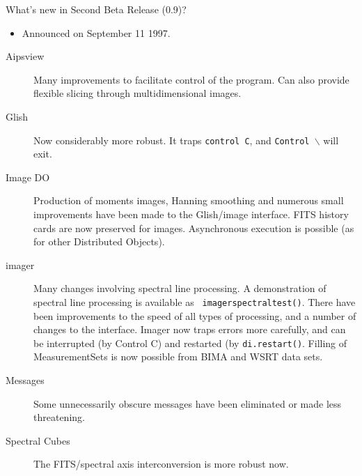 \begin{slide}{What's new in Second Beta Release (0.9)?}

\begin{itemize}
\item Announced on September 11 1997. 
\end{itemize}
\begin{description}
\item[Aipsview] Many improvements to facilitate control of the
     program. Can also provide flexible slicing through multidimensional
     images.  
\item[Glish] Now considerably more robust. It traps {\tt control C}, and
{\tt Control $\backslash$} will exit.
\item[Image DO] Production of moments images, Hanning smoothing and 
numerous small improvements have been made to the Glish/image
interface. FITS history cards are now preserved for
images. Asynchronous execution is possible (as for other Distributed
Objects). 
\item[imager] Many changes involving spectral line processing.
A demonstration of spectral line processing is available as {\tt
imagerspectraltest()}. There have been improvements to the speed of
all types of processing, and a number of changes to the
interface. Imager now traps errors more carefully, and can be
interrupted (by Control C) and restarted (by {\tt di.restart()}.
Filling of MeasurementSets is now possible from BIMA and WSRT
data sets.
\item[Messages] Some unnecessarily obscure messages have been eliminated
or made less threatening.
\item[Spectral Cubes] The FITS/spectral axis interconversion is more
robust now.  
\end{description}
\end{slide}


